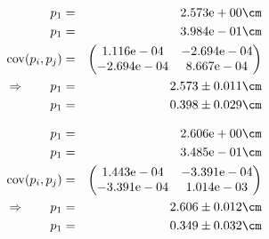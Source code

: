 \begin{eqnarray}
    p_1 &=& 2.573\mathrm{e}+00 \cm \nonumber \\
    p_1 &=& 3.984\mathrm{e}-01 \cm \nonumber \\
    \mathrm{cov}(p_i, p_j) &=& 
    \begin{pmatrix}
        1.116\mathrm{e}-04 &-2.694\mathrm{e}-04 \\
        -2.694\mathrm{e}-04 &8.667\mathrm{e}-04 \\
    \end{pmatrix}
\\ \Rightarrow \qquad
    p_1 &=& 2.573 \pm 0.011 \cm\\
    p_1 &=& 0.398 \pm 0.029 \cm
\end{eqnarray}

\begin{eqnarray}
    p_1 &=& 2.606\mathrm{e}+00 \cm \nonumber \\
    p_1 &=& 3.485\mathrm{e}-01 \cm \nonumber \\
    \mathrm{cov}(p_i, p_j) &=& 
    \begin{pmatrix}
        1.443\mathrm{e}-04 &-3.391\mathrm{e}-04 \\
        -3.391\mathrm{e}-04 &1.014\mathrm{e}-03 \\
    \end{pmatrix}
\\ \Rightarrow \qquad
    p_1 &=& 2.606 \pm 0.012 \cm\\
    p_1 &=& 0.349 \pm 0.032 \cm
\end{eqnarray}

